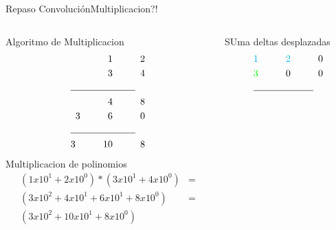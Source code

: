 \begin{frame}{Repaso Convolución}{Multiplicacion?!}
   \begin{columns}[t]
      \hspace{5pt}
   \begin{column}{.3\textwidth}
      \tiny
      Algoritmo de Multiplicacion
          \begin{align*}
               1\hspace{1cm} 2\\
               3\hspace{1cm} 4 \\
               \cline{1-2}
               4 \hspace{1cm} 8 \\
               3 \hspace{1cm} 6 \hspace{1cm}0 \\
               \cline{1-2}
               3 \hspace{1cm} 10 \hspace{1cm} 8\\
            \end{align*}
      Multiplicacion de polinomios
            \begin{align*}
               \left( 1 x10^1 + 2 x10^0 \right) * \left( 3 x10^1 + 4 x10^0 \right) &=  \\
               \left( 3 x10^2 + 4 x10^1 + 6 x10^1 + 8 x10^0\right) &=  \\
               \left( 3 x10^2 + 10 x10^1 + 8 x10^0\right) \\
            \end{align*}
      \end{column}
      \hspace{2pt}
      \vrule
      \hspace{2pt}
      \begin{column}{.3\textwidth}
      \tiny
      SUma deltas desplazadas
            \begin{align*}
               \textcolor{cyan} {1} \hspace{1cm}\textcolor{cyan}{2} \hspace{1cm}0\\
               \textcolor{green}{3} \hspace{1cm}                 0  \hspace{1cm}0\\
               \cline{1-2}

\end{align*}
\end{column}
\end{columns}
\end{frame}
